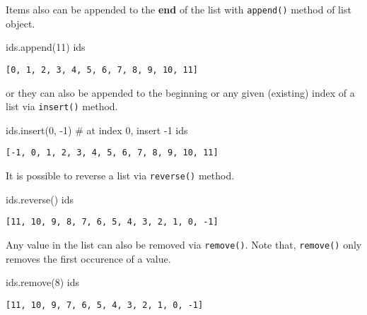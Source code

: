 \documentclass[
  letterpaper,
  DIV=11,
  numbers=noendperiod]{scrreprt}
\newenvironment{Shaded}{\begin{snugshade}}{\end{snugshade}}
\newcommand{\CommentTok}[1]{\textcolor[rgb]{0.37,0.37,0.37}{#1}}
\newcommand{\DecValTok}[1]{\textcolor[rgb]{0.68,0.00,0.00}{#1}}
\newcommand{\NormalTok}[1]{\textcolor[rgb]{0.00,0.23,0.31}{#1}}
\newcommand{\OperatorTok}[1]{\textcolor[rgb]{0.37,0.37,0.37}{#1}}
\begin{document}
Items also can be appended to the \textbf{end} of the list with
\texttt{append()} method of list object.

\begin{Shaded}
\begin{Highlighting}[]
\NormalTok{ids.append(}\DecValTok{11}\NormalTok{)}
\NormalTok{ids}
\end{Highlighting}
\end{Shaded}

\begin{verbatim}
[0, 1, 2, 3, 4, 5, 6, 7, 8, 9, 10, 11]
\end{verbatim}

or they can also be appended to the beginning or any given (existing)
index of a list via \texttt{insert()} method.

\begin{Shaded}
\begin{Highlighting}[]
\NormalTok{ids.insert(}\DecValTok{0}\NormalTok{, }\OperatorTok{{-}}\DecValTok{1}\NormalTok{) }\CommentTok{\# at index 0, insert {-}1}
\NormalTok{ids}
\end{Highlighting}
\end{Shaded}

\begin{verbatim}
[-1, 0, 1, 2, 3, 4, 5, 6, 7, 8, 9, 10, 11]
\end{verbatim}

It is possible to reverse a list via \texttt{reverse()} method.

\begin{Shaded}
\begin{Highlighting}[]
\NormalTok{ids.reverse()}
\NormalTok{ids}
\end{Highlighting}
\end{Shaded}

\begin{verbatim}
[11, 10, 9, 8, 7, 6, 5, 4, 3, 2, 1, 0, -1]
\end{verbatim}

Any value in the list can also be removed via \texttt{remove()}. Note
that, \texttt{remove()} only removes the first occurence of a value.

\begin{Shaded}
\begin{Highlighting}[]
\NormalTok{ids.remove(}\DecValTok{8}\NormalTok{)}
\NormalTok{ids}
\end{Highlighting}
\end{Shaded}

\begin{verbatim}
[11, 10, 9, 7, 6, 5, 4, 3, 2, 1, 0, -1]
\end{verbatim}
\end{document}
